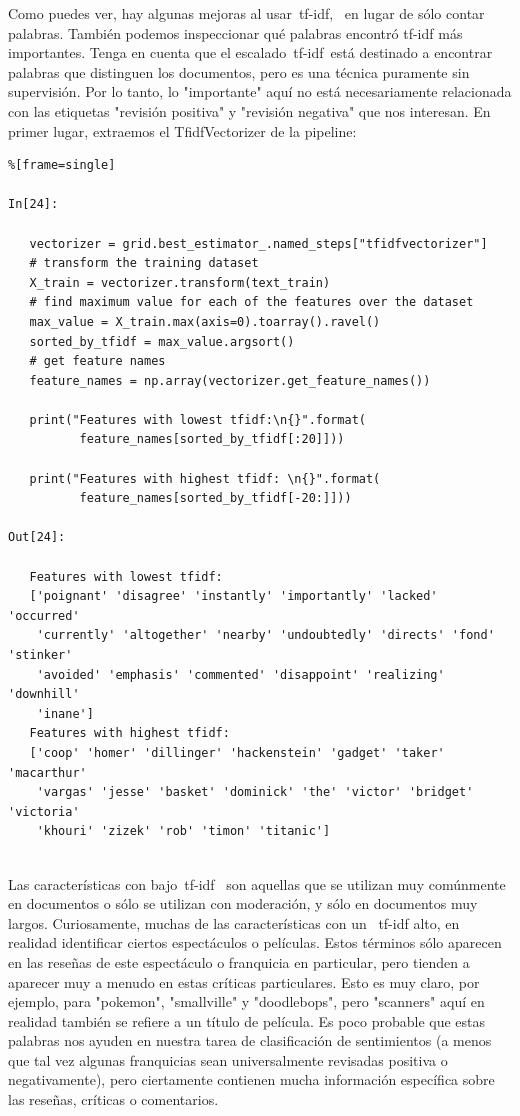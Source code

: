 Como puedes ver, hay algunas mejoras al usar   \,tf-idf, \, en lugar de sólo contar palabras. 
También podemos inspeccionar qué palabras   encontró  tf-idf   más importantes. 
Tenga en cuenta que el escalado  \,tf-idf\, está destinado a encontrar palabras que distinguen los documentos, pero es una técnica puramente sin supervisión. 
Por lo tanto, lo "{}importante"{}  aquí no está necesariamente  relacionada con las etiquetas 
 "{}revisión positiva"{}  y  "{}revisión negativa"{}  que nos interesan. 
 En primer lugar, extraemos el {\ttfamily TfidfVectorizer} de la pipeline:

\begin{lstlisting}%[frame=single]

In[24]:

   vectorizer = grid.best_estimator_.named_steps["tfidfvectorizer"]
   # transform the training dataset
   X_train = vectorizer.transform(text_train)
   # find maximum value for each of the features over the dataset
   max_value = X_train.max(axis=0).toarray().ravel()
   sorted_by_tfidf = max_value.argsort()
   # get feature names
   feature_names = np.array(vectorizer.get_feature_names())
   
   print("Features with lowest tfidf:\n{}".format(
          feature_names[sorted_by_tfidf[:20]]))
   
   print("Features with highest tfidf: \n{}".format(
          feature_names[sorted_by_tfidf[-20:]]))

Out[24]:

   Features with lowest tfidf:
   ['poignant' 'disagree' 'instantly' 'importantly' 'lacked' 'occurred'
    'currently' 'altogether' 'nearby' 'undoubtedly' 'directs' 'fond' 'stinker'
    'avoided' 'emphasis' 'commented' 'disappoint' 'realizing' 'downhill'
    'inane']
   Features with highest tfidf:
   ['coop' 'homer' 'dillinger' 'hackenstein' 'gadget' 'taker' 'macarthur'
    'vargas' 'jesse' 'basket' 'dominick' 'the' 'victor' 'bridget' 'victoria'
    'khouri' 'zizek' 'rob' 'timon' 'titanic']
 
\end{lstlisting}



Las características con bajo  \,tf-idf \,  son aquellas que se utilizan muy comúnmente en documentos
o sólo se utilizan con moderación, y sólo en documentos muy largos. Curiosamente, muchas de las características con un \, tf-idf  alto,  en realidad identificar ciertos espectáculos o películas.
Estos términos sólo aparecen en las reseñas de este espectáculo o franquicia en particular, 
pero tienden a aparecer muy a menudo en estas críticas particulares.  
Esto es muy claro, por ejemplo, para "{}pokemon"{}, "{}smallville"{} y "{}doodlebops"{}, pero "{}scanners"{}  aquí en realidad también se refiere a un título de película. 
Es poco probable que estas palabras nos ayuden en nuestra tarea de clasificación de sentimientos (a menos que tal vez algunas franquicias sean universalmente revisadas positiva o negativamente), pero ciertamente contienen mucha información específica sobre las reseñas, críticas o comentarios.\\


